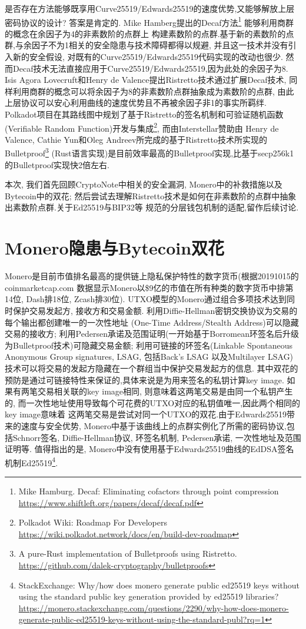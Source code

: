 \documentclass{article}
\begin{document}
是否存在方法能够既享用Curve25519/Edwards25519的速度优势,又能够解放上层密码协议的设计?
答案是肯定的. Mike Hamberg提出的Decaf方法\footnote{
Mike Hamburg. Decaf: Eliminating cofactors through point compression
\url{https://www.shiftleft.org/papers/decaf/decaf.pdf}}
能够利用商群的概念在余因子为4的非素数阶的点群上
构建素数阶的点群.基于新的素数阶的点群,与余因子不为1相关的安全隐患与技术障碍都得以规避,
并且这一技术并没有引入新的安全假设, 对既有的Curve25519/Edwards25519代码实现的改动也很少.
然而Decaf技术无法直接应用于Curve25519/Edwards25519,因为此处的余因子为8.
Isis Agora Lovecruft和Henry de Valence提出Ristretto技术通过扩展Decaf技术,
同样利用商群的概念可以将余因子为8的非素数阶点群抽象成为素数阶的点群, 
由此上层协议可以安心利用曲线的速度优势且不再被余因子非1的事实所羁绊.
Polkadot项目在其路线图中规划了基于Ristretto的签名机制和可验证随机函数(Verifiable Random 
Function)开发与集成\footnote{Polkadot Wiki: Roadmap For Developers
\url{https://wiki.polkadot.network/docs/en/build-dev-roadmap}}, 而由Interstellar赞助由
Henry de Valence, Cathie Yun和Oleg Andreev所完成的基于Ristretto技术所实现的Bulletproof\footnote{
A pure-Rust implementation of Bulletproofs using Ristretto.
\url{https://github.com/dalek-cryptography/bulletproofs}}
(Rust语言实现)是目前效率最高的Bulletproof实现,比基于secp256k1的Bulletproof实现快2倍左右.

本次, 我们首先回顾CryptoNote中相关的安全漏洞, Monero中的补救措施以及Bytecoin中的双花;
然后尝试去理解Ristretto技术是如何在非素数阶的点群中抽象出素数阶点群.关于Ed25519与BIP32等
规范的分层钱包机制的适配,留作后续讨论.

\section{Monero隐患与Bytecoin双花}

Monero是目前市值排名最高的提供链上隐私保护特性的数字货币(根据20191015的coinmarketcap.com
数据显示Monero以\$9亿的市值在所有种类的数字货币中排第14位, Dash排18位, Zcash排30位).
UTXO模型的Monero通过组合多项技术达到同时保护交易发起方, 接收方和交易金额. 
利用Diffie-Hellman密钥交换协议为交易的每个输出都创建唯一的一次性地址
(One-Time Address/Stealth Address)可以隐藏交易的接收方; 
利用Pedersen承诺及范围证明(一开始基于Borromean环签名后升级为Bulletproof技术)可隐藏交易金额;
利用可链接的环签名(Linkable Spontaneous Anonymous Group signatures, LSAG, 包括Back's LSAG
以及Multilayer LSAG)技术可以将交易的发起方隐藏在一个群组当中保护交易发起方的信息.
其中双花的预防是通过可链接特性来保证的,具体来说是为用来签名的私钥计算key image.
如果有两笔交易相关联的key image相同, 则意味着这两笔交易是由同一个私钥产生的,
而一次性地址使用导致每个可花费的UTXO对应的私钥值唯一,因此两个相同的key image意味着
这两笔交易是尝试对同一个UTXO的双花.由于Edwards25519带来的速度与安全优势, 
Monero中基于该曲线上的点群实例化了所需的密码协议,包括Schnorr签名, Diffie-Hellman协议,
环签名机制, Pedersen承诺, 一次性地址及范围证明等.
值得指出的是, Monero中没有使用基于Edwards25519曲线的EdDSA签名机制Ed25519\footnote{
StackExchange: Why/how does monero generate public ed25519 keys without using the standard public key generation provided by ed25519 libraries?
\url{https://monero.stackexchange.com/questions/2290/why-how-does-monero-generate-public-ed25519-keys-without-using-the-standard-publ?rq=1}}.
\end{document}
